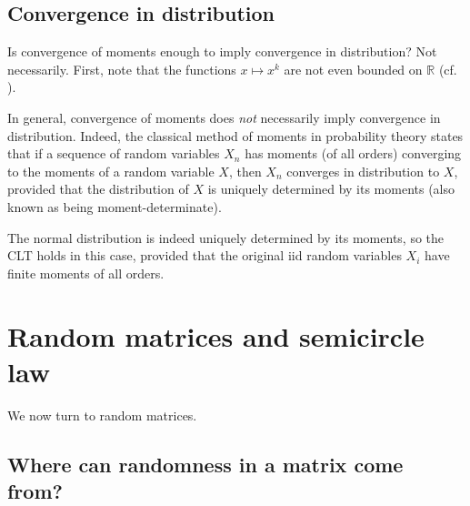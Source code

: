 \documentclass[letterpaper,11pt,oneside,reqno]{article}
\numberwithin{equation}{section}
\theoremstyle{definition}
\begin{document}
\subsection{Convergence in distribution}

Is convergence of moments enough to imply convergence in distribution?
Not necessarily.
First, note that the functions $x\mapsto x^k$
are not even bounded on $\mathbb{R}$
(cf. ).

In general, convergence of moments does \emph{not} necessarily imply convergence in distribution. Indeed, the classical method of moments in probability
theory
\cite[Theorem~30.2]{billingsley1995probability}
states that if a sequence of random variables \(X_n\) has
moments (of all orders) converging to the moments of a
random variable \(X\), then \(X_n\) converges in
distribution to \(X\), provided that the distribution of
\(X\) is uniquely determined by its moments (also known as
being moment-determinate).

The normal distribution is indeed uniquely determined by its
moments, so the CLT holds in this case, provided that the
original iid random variables $X_i$ have finite moments of
all orders.

\section{Random matrices and semicircle law}

We now turn to random matrices.

\subsection{Where can randomness in a matrix come from?}
\end{document}

